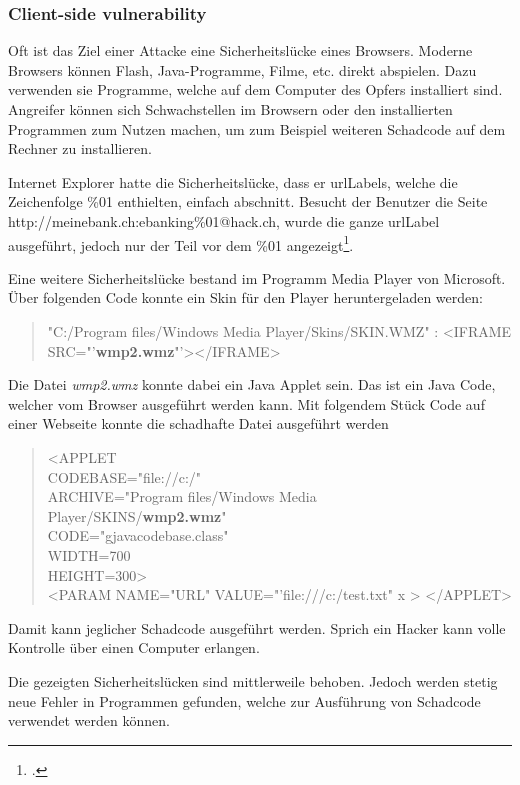 \subsubsection{Client-side vulnerability}
Oft ist das Ziel einer Attacke eine Sicherheitslücke eines Browsers. Moderne Browsers können Flash, Java-Programme, Filme, etc. direkt abspielen. Dazu verwenden sie Programme, welche auf dem Computer des Opfers installiert sind. Angreifer können sich Schwachstellen im Browsern oder den installierten Programmen zum Nutzen machen, um zum Beispiel weiteren Schadcode auf dem Rechner zu installieren. 

Internet Explorer hatte die Sicherheitslücke, dass er \Glspl{urlLabel}, welche die Zeichenfolge \%01 enthielten, einfach abschnitt. Besucht der Benutzer die Seite \\
http://meinebank.ch:ebanking\%01@hack.ch, wurde die ganze \Gls{urlLabel} ausgeführt, jedoch nur der Teil vor dem \%01 angezeigt\footcite{NISR-WP-Phishingv101doc_2015-06-29}.

Eine weitere Sicherheitslücke bestand im Programm Media Player von Microsoft. Über folgenden Code konnte ein Skin für den Player heruntergeladen werden:
\begin{quote}
"C:/Program files/Windows Media Player/Skins/SKIN.WMZ" : <IFRAME
SRC="'\textbf{wmp2.wmz}"'></IFRAME>
\end{quote}

Die Datei \textit{wmp2.wmz} konnte dabei ein Java Applet sein. Das ist ein Java Code, welcher vom Browser ausgeführt werden kann. Mit folgendem Stück Code auf einer Webseite konnte die schadhafte Datei ausgeführt werden
\begin{quote}
<APPLET \\
  CODEBASE="file://c:/" \\
  ARCHIVE="Program files/Windows Media\\
  Player/SKINS/\textbf{wmp2.wmz}"\\
  CODE="gjavacodebase.class" \\
  WIDTH=700 \\
  HEIGHT=300>\\
  <PARAM NAME="URL" VALUE="'file:///c:/test.txt" x >
</APPLET>
\end{quote}
Damit kann jeglicher Schadcode ausgeführt werden. Sprich ein Hacker kann volle Kontrolle über einen Computer erlangen.

Die gezeigten Sicherheitslücken sind mittlerweile behoben. Jedoch werden stetig neue Fehler in Programmen gefunden, welche zur Ausführung von Schadcode verwendet werden können.

